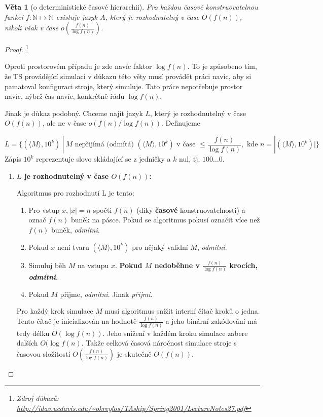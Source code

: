 \documentclass[11pt]{report} %
\newcommand{\N}{\mathbb{N}}
\newtheorem{theorem}{Věta}[section]
\numberwithin{equation}{section}
\begin{document}
\begin{theorem}[o deterministické časové hierarchii] Pro každou časově konstruovatelnou funkci $f : \N \mapsto \N$ existuje jazyk $A$, který je rozhodnutelný v čase $O(f(n))$, nikoli však v čase $o(\frac{f(n)}{\log f(n)})$.
\end{theorem}

\begin{proof}\footnote{\textit{Zdroj důkazů: \url{http://idav.ucdavis.edu/~okreylos/TAship/Spring2001/LectureNotes27.pdf}}}
	
Oproti prostorovém případu je zde navíc faktor $\log f(n)$. To je způsobeno tím, že TS provádějící simulaci v důkazu této věty musí provádět práci navíc, aby si pamatoval konfiguraci stroje, který simuluje. Tato práce nepotřebuje prostor navíc, nýbrž čas navíc, konkrétně řádu $\log f(n)$. 

Jinak je důkaz podobný. Chceme najít jazyk $L$, který je rozhodnutelný v čase $O(f(n))$, ale ne v čase $o(f(n)/\log f(n))$. Definujeme 

$$L = \{(\langle M \rangle, 10^k)\ |\ M \text{ nepřijímá (odmítá) } (\langle M \rangle, 10^k) \text{ v čase }\leq \frac{f(n)}{\log f(n)}, \text{ kde } n = |(\langle M \rangle, 10^k)|\} $$
Zápis $10^k$ reprezentuje slovo skládající se z jedničky a $k$ nul, tj. $100\dots0$.

\begin{enumerate}
	\item \textbf{$L$ je rozhodnutelný v čase $O(f(n))$:}
	
	Algoritmus pro rozhodnutí L je tento:
	\begin{enumerate}
		
		
		\item Pro vstup $x, |x| = n$ spočti $f(n)$ (díky \textbf{časové} konstruovatelnosti) a označ $f(n)$ buněk na pásce. Pokud se algoritmus pokusí označit více než $f(n)$ buněk, \textit{odmítni}.
		\item Pokud $x$ není tvaru $(\langle M \rangle, 10^k)$ pro nějaký validní $M$, \textit{odmítni}.
		\item Simuluj běh $M$ na vstupu $x$. \textbf{Pokud $M$ nedoběhne v $\frac{f(n)}{\log f(n)}$ krocích, \textit{odmítni}.}
		\item Pokud $M$ přijme, \textit{odmítni}. Jinak \textit{přijmi}.
	\end{enumerate}
	
	Pro každý krok simulace $M$ musí algoritmus snížit interní čítač kroků o jedna. Tento čítač je inicializován na hodnotě $\frac{f(n)}{\log f(n)}$ a jeho binární zakódování má tedy délku $O(\log f(n))$. Jeho snížení v každém kroku simulace zabere dalších $O(\log f(n)$. Takže celková časová náročnost simulace stroje s časovou složitostí $O(\frac{f(n)}{\log f(n)})$ je skutečně $O(f(n))$.
	

\end{enumerate}
\end{proof}
\end{document}

